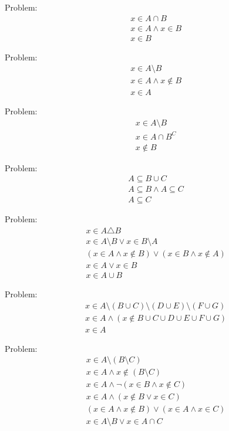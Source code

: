 \documentclass[12pt,letterpaper]{article}
\begin{document}
Problem:
\begin{align}
& x \in A \cap B \\
& x \in A \wedge x \in B \\
& x \in B
\end{align}

Problem:
\begin{align}
& x \in A \setminus B \\
& x \in A \wedge x \notin B \\
& x \in A
\end{align}

Problem:
\begin{align}
& x \in A \setminus B \\
& x \in A \cap B ^C \\
& x \notin B
\end{align}

Problem:
\begin{align}
& A \subseteq B \cup C \\
& A \subseteq B \wedge A \subseteq C \\
& A \subseteq C
\end{align}

Problem:
\begin{align}
    & x \in A \triangle B \\
    & x \in A \setminus B \vee x \in B \setminus A \\
    & (x \in A \wedge x \notin B) \vee (x \in B \wedge x \notin A) \\
    & x \in A \vee x \in B \\
    & x \in A \cup B
\end{align}

Problem:
\begin{align}
& x \in A \setminus ( B \cup C ) \setminus ( D \cup E ) \setminus ( F \cup G ) \\
& x \in A \wedge (x \notin B \cup C \cup D \cup E \cup F \cup G ) \\
& x \in A
\end{align}

Problem:
\begin{align}
    & x \in A \setminus ( B \setminus C ) \\
    & x \in A \wedge x \notin (B \setminus C) \\
    & x \in A \wedge \neg (x \in B \wedge x \notin C ) \\
    & x \in A \wedge (x \notin B \vee x \in C ) \\
    & (x \in A \wedge x \notin B) \vee (x \in A \wedge x \in C) \\
    & x \in A \setminus B \vee x \in A \cap C
\end{align}
\end{document}
